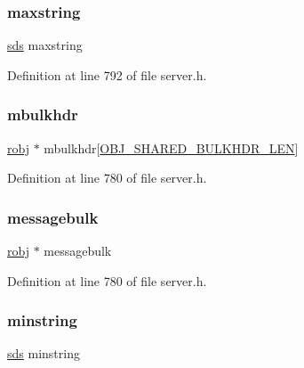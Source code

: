 \subsubsection{\texorpdfstring{maxstring}{maxstring}}
{\footnotesize\ttfamily \hyperlink{sds_8h_ad69abac3df4532879db9642c95f5ef6f}{sds} maxstring}



Definition at line 792 of file server.\+h.

\mbox{\label{structshared_objects_struct_a5ba04845895cc30f8583215e1b1bfd32}} 
\subsubsection{\texorpdfstring{mbulkhdr}{mbulkhdr}}
{\footnotesize\ttfamily \hyperlink{server_8h_a540f174d2685422fbd7d12e3cd44c8e2}{robj} $\ast$ mbulkhdr\mbox{[}\hyperlink{server_8h_aff2f6e62c729d3f8b119d761818be317}{O\+B\+J\+\_\+\+S\+H\+A\+R\+E\+D\+\_\+\+B\+U\+L\+K\+H\+D\+R\+\_\+\+L\+EN}\mbox{]}}



Definition at line 780 of file server.\+h.

\mbox{\label{structshared_objects_struct_a08fd7c7369de058dcf4225d8cd4e8e78}} 
\subsubsection{\texorpdfstring{messagebulk}{messagebulk}}
{\footnotesize\ttfamily \hyperlink{server_8h_a540f174d2685422fbd7d12e3cd44c8e2}{robj} $\ast$ messagebulk}



Definition at line 780 of file server.\+h.

\mbox{\label{structshared_objects_struct_a5d1b090719486b6cba969aa7f76fcf8e}} 
\subsubsection{\texorpdfstring{minstring}{minstring}}
{\footnotesize\ttfamily \hyperlink{sds_8h_ad69abac3df4532879db9642c95f5ef6f}{sds} minstring}



